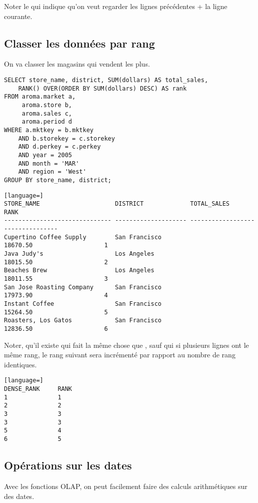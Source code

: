 Noter le  qui indique qu'on veut regarder les  lignes précédentes + la ligne courante.

\subsection{Classer les données par rang}
On va classer les magasins qui vendent les plus.

\begin{lstlisting}
SELECT store_name, district, SUM(dollars) AS total_sales,
    RANK() OVER(ORDER BY SUM(dollars) DESC) AS rank
FROM aroma.market a,
     aroma.store b,
     aroma.sales c,
     aroma.period d
WHERE a.mktkey = b.mktkey
    AND b.storekey = c.storekey
    AND d.perkey = c.perkey
    AND year = 2005
    AND month = 'MAR'
    AND region = 'West'
GROUP BY store_name, district;
\end{lstlisting}

\begin{lstlisting}[language=]
STORE_NAME                     DISTRICT             TOTAL_SALES                       RANK                
------------------------------ -------------------- ---------------------------------
Cupertino Coffee Supply        San Francisco                                 18670.50                    1
Java Judy's                    Los Angeles                                   18015.50                    2
Beaches Brew                   Los Angeles                                   18011.55                    3
San Jose Roasting Company      San Francisco                                 17973.90                    4
Instant Coffee                 San Francisco                                 15264.50                    5
Roasters, Los Gatos            San Francisco                                 12836.50                    6
\end{lstlisting}

Noter, qu'il existe  qui fait la même chose que , sauf qui si plusieurs lignes ont le même rang, le rang suivant sera incrémenté par rapport au nombre de rang identiques.

\begin{lstlisting}[language=]
DENSE_RANK     RANK
1              1
2              2
3              3
3              3
5              4
6              5
\end{lstlisting}

\subsection{Opérations sur les dates}
Avec les fonctions OLAP, on peut facilement faire des calculs arithmétiques sur des dates.

